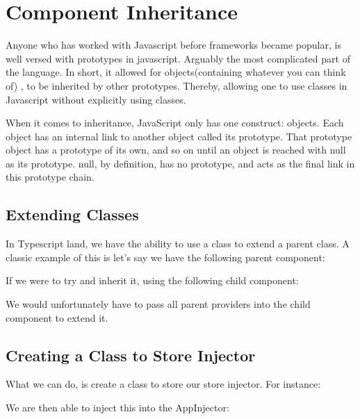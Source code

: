 \maketitle{}
\section{ Component Inheritance }

Anyone who has worked with Javascript before frameworks became popular, is well
versed with prototypes in javascript. Arguably the most complicated part of the
language. In short, it allowed for objects(containing whatever you can think of)
, to be inherited by other prototypes. Thereby, allowing one to use classes in
Javascript without explicitly using classes.

When it comes to inheritance, JavaScript only has one construct: objects.
Each object has an internal link to another object called its prototype. That
prototype object has a prototype of its own, and so on until an object is
reached with null as its prototype. null, by definition, has no prototype, and
acts as the final link in this prototype chain.

\subsection{ Extending Classes }
In Typescript land, we have the ability to use a class to extend a parent class.
A classic example of this is let's say we have the following parent component:



If we were to try and inherit it, using the following child component:



We would unfortunately have to pass all parent providers into the child
component to extend it.

\subsection{ Creating a Class to Store Injector }
What we can do, is create a class to store our store injector. For instance:


We are then able to inject this into the AppInjector:


